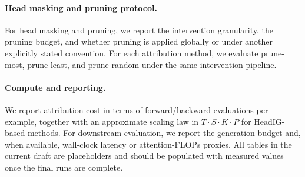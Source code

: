 \paragraph{Head masking and pruning protocol.}
For head masking and pruning, we report the intervention granularity, the pruning budget, and whether pruning is applied globally or under another explicitly stated convention. For each attribution method, we evaluate prune-most, prune-least, and prune-random under the same intervention pipeline.

\paragraph{Compute and reporting.}
We report attribution cost in terms of forward/backward evaluations per example, together with an approximate scaling law in $T\cdot S\cdot K\cdot P$ for HeadIG-based methods. For downstream evaluation, we report the generation budget and, when available, wall-clock latency or attention-FLOPs proxies. All tables in the current draft are placeholders and should be populated with measured values once the final runs are complete.
